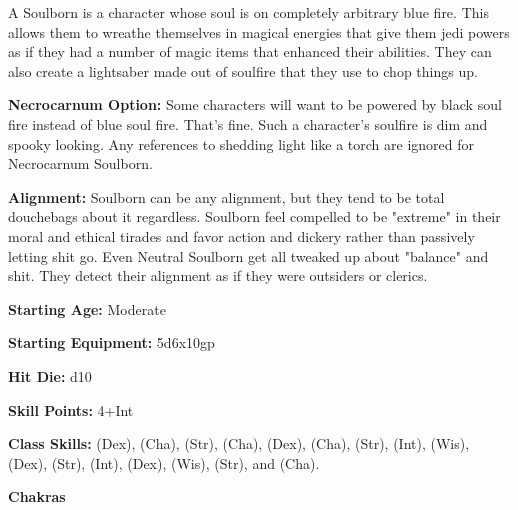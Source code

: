 
A Soulborn is a character whose soul is on completely arbitrary blue fire. This allows them to wreathe themselves in magical energies that give them jedi powers as if they had a number of magic items that enhanced their abilities. They can also create a lightsaber made out of soulfire that they use to chop things up. 

\textbf{Necrocarnum Option:} Some characters will want to be powered by black soul fire instead of blue soul fire. That's fine. Such a character's soulfire is dim and spooky looking. Any references to shedding light like a torch are ignored for Necrocarnum Soulborn. 

\textbf{Alignment:} Soulborn can be any alignment, but they tend to be total douchebags about it regardless. Soulborn feel compelled to be "extreme" in their moral and ethical tirades and favor action and dickery rather than passively letting shit go. Even Neutral Soulborn get all tweaked up about "balance" and shit. They detect their alignment as if they were outsiders or clerics. 

\textbf{Starting Age:} Moderate

\textbf{Starting Equipment:} 5d6x10gp 

\textbf{Hit Die:} d10 

\textbf{Skill Points:} 4+Int 

\textbf{Class Skills:}  (Dex),  (Cha),  (Str),  (Cha),  (Dex),  (Cha),  (Str),  (Int),  (Wis),  (Dex),  (Str),  (Int),  (Dex),  (Wis),  (Str), and  (Cha).

\goodbab{}
\poorfor{}
\poorref{}
\goodwil{}


\begin{extraclasstable}{\textbf{Chakras}}
\end{extraclasstable}

